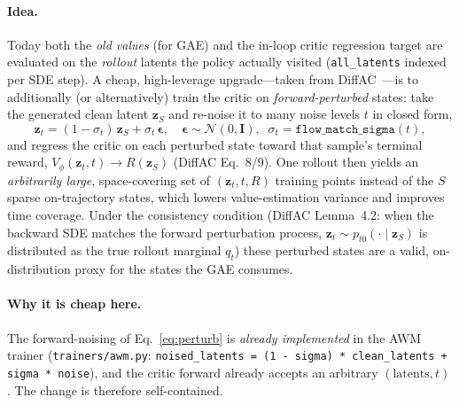 \documentclass[11pt]{article}
\theoremstyle{plain}
\theoremstyle{remark}
\newcommand{\zt}{\bm{z}}
\begin{document}
\paragraph{Idea.}
Today both the \emph{old values} (for GAE) and the in-loop critic regression target
are evaluated on the \emph{rollout} latents the policy actually visited
(\texttt{all\_latents} indexed per SDE step). A cheap, high-leverage upgrade---taken from
DiffAC~\cite{zhou2024diffac}---is to additionally (or alternatively) train the critic on
\emph{forward-perturbed} states: take the generated clean latent $\zt_S$ and re-noise it
to many noise levels $t$ in closed form,
\begin{equation}
\label{eq:perturb}
\zt_t = (1-\sigma_t)\,\zt_S + \sigma_t\,\bm{\epsilon},
\quad \bm{\epsilon}\sim\mathcal N(0,\bm I),\;\; \sigma_t = \texttt{flow\_match\_sigma}(t),
\end{equation}
and regress the critic on each perturbed state toward that sample's terminal reward,
$V_\phi(\zt_t,t)\to R(\zt_S)$ (DiffAC Eq.~8/9). One rollout then yields an
\emph{arbitrarily large}, space-covering set of $(\zt_t,t,R)$ training points instead of
the $S$ sparse on-trajectory states, which lowers value-estimation variance and
improves time coverage. Under the consistency condition (DiffAC Lemma~4.2: when the
backward SDE matches the forward perturbation process, $\zt_t\sim p_{t0}(\cdot\mid\zt_S)$
is distributed as the true rollout marginal $q_t$) these perturbed states are a valid,
on-distribution proxy for the states the GAE consumes.

\paragraph{Why it is cheap here.}
The forward-noising of Eq.~\eqref{eq:perturb} is \emph{already implemented} in the AWM
trainer (\texttt{trainers/awm.py}: \texttt{noised\_latents = (1 - sigma) * clean\_latents
+ sigma * noise}), and the critic forward already accepts an arbitrary
$(\text{latents}, t)$. The change is therefore self-contained.
\end{document}

